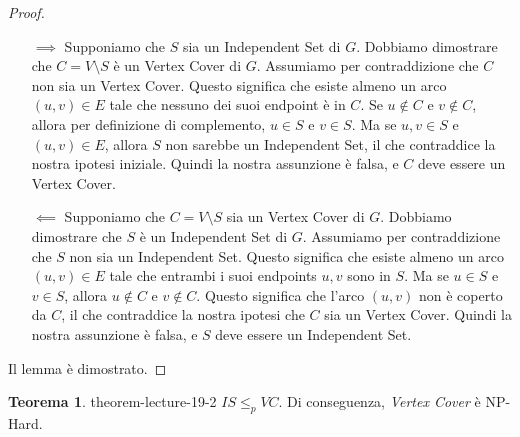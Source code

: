 \documentclass[a4paper]{article}
\theoremstyle{definition} %
\newtheorem{theorem}{Teorema}
[section]
\theoremstyle{definition} %
\begin{document}
\begin{proof}
\begin{itemize}
    \item[$\implies$] Supponiamo che $S$ sia un Independent Set di $G$.
    Dobbiamo dimostrare che $C = V \setminus S$ è un Vertex Cover di $G$.
    Assumiamo per contraddizione che $C$ non sia un Vertex Cover. Questo significa che esiste almeno un arco $(u, v) \in E$ tale che nessuno dei suoi endpoint è in $C$. Se $u \notin C$ e $v \notin C$, allora per definizione di complemento, $u \in S$ e $v \in S$. Ma se $u, v \in S$ e $(u, v) \in E$, allora $S$ non sarebbe un Independent Set, il che contraddice la nostra ipotesi iniziale. Quindi la nostra assunzione è falsa, e $C$ deve essere un Vertex Cover.

    \item[$\impliedby$] Supponiamo che $C = V \setminus S$ sia un Vertex Cover di $G$.
    Dobbiamo dimostrare che $S$ è un Independent Set di $G$.
    Assumiamo per contraddizione che $S$ non sia un Independent Set. Questo significa che esiste almeno un arco $(u, v) \in E$ tale che entrambi i suoi endpoints $u, v$ sono in $S$. Ma se $u \in S$ e $v \in S$, allora $u \notin C$ e $v \notin C$. Questo significa che l'arco $(u, v)$ non è coperto da $C$, il che contraddice la nostra ipotesi che $C$ sia un Vertex Cover. Quindi la nostra assunzione è falsa, e $S$ deve essere un Independent Set.
\end{itemize}
Il lemma è dimostrato.
\end{proof}

\begin{theorem}{}{{ theorem-lecture-19-2 }}
$IS \le_p VC$. Di conseguenza, \emph{Vertex Cover} è NP-Hard.
\end{theorem}
\end{document}
